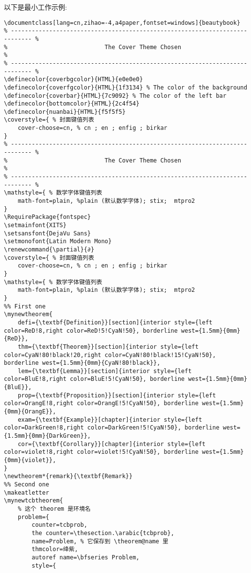\documentclass[lang=cn,zihao=-4,a4paper,fontset=windows]{beautybook}
\renewcommand{\partial}{∂}
\begin{document}
以下是最小工作示例:
\begin{lstlisting}
\documentclass[lang=cn,zihao=-4,a4paper,fontset=windows]{beautybook}
% ---------------------------------------------------------------------------- %
%                            The Cover Theme Chosen                            %
% ---------------------------------------------------------------------------- %
\definecolor{coverbgcolor}{HTML}{e0e0e0}
\definecolor{coverfgcolor}{HTML}{1f3134} % The color of the background
\definecolor{coverbar}{HTML}{7c9092} % The color of the left bar
\definecolor{bottomcolor}{HTML}{2c4f54}
\definecolor{nuanbai}{HTML}{f5f5f5}
\coverstyle={ % 封面键值列表
    cover-choose=cn, % cn ; en ; enfig ; birkar
}
% ---------------------------------------------------------------------------- %
%                            The Cover Theme Chosen                            %
% ---------------------------------------------------------------------------- %
\mathstyle={ % 数学字体键值列表
    math-font=plain, %plain (默认数学字体); stix;  mtpro2
}
\RequirePackage{fontspec}
\setmainfont{XITS}
\setsansfont{DejaVu Sans}
\setmonofont{Latin Modern Mono}
\renewcommand{\partial}{∂}
\coverstyle={ % 封面键值列表
    cover-choose=cn, % cn ; en ; enfig ; birkar
}
\mathstyle={ % 数学字体键值列表
    math-font=plain, %plain (默认数学字体); stix;  mtpro2
}
%% First one
\mynewtheorem{
    defi={\textbf{Definition}}[section]{interior style={left color=ReD!8,right color=ReD!5!CyaN!50}, borderline west={1.5mm}{0mm}{ReD}},
    thm={\textbf{Theorem}}[section]{interior style={left color=CyaN!80!black!20,right color=CyaN!80!black!15!CyaN!50}, borderline west={1.5mm}{0mm}{CyaN!80!black}},
    lem={\textbf{Lemma}}[section]{interior style={left color=BluE!8,right color=BluE!5!CyaN!50}, borderline west={1.5mm}{0mm}{BluE}},
    prop={\textbf{Proposition}}[section]{interior style={left color=OrangE!8,right color=OrangE!5!CyaN!50}, borderline west={1.5mm}{0mm}{OrangE}},
    exam={\textbf{Example}}[chapter]{interior style={left color=DarkGreen!8,right color=DarkGreen!5!CyaN!50}, borderline west={1.5mm}{0mm}{DarkGreen}},
    cor={\textbf{Corollary}}[chapter]{interior style={left color=violet!8,right color=violet!5!CyaN!50}, borderline west={1.5mm}{0mm}{violet}},
}
\newtheorem*{remark}{\textbf{Remark}}
%% Second one
\makeatletter
\mynewtcbtheorem{
    % 这个 theorem 是环境名
    problem={
        counter=tcbprob, 
        the counter=\thesection.\arabic{tcbprob}, 
        name=Problem, % 它保存到 \theorem@name 里
        thmcolor=绛紫,
        autoref name=\bfseries Problem, 
        style={

\end{lstlisting}
\end{document}
